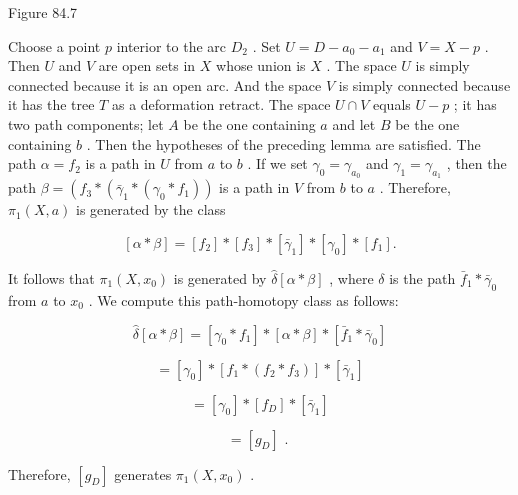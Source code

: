 Figure 84.7

Choose a point \(p\) interior to the arc \({D}_{2}\) . Set \(U = D - {a}_{0} - {a}_{1}\) and \(V = X - p\) . Then \(U\) and \(V\) are open sets in \(X\) whose union is \(X\) . The space \(U\) is simply connected because it is an open arc. And the space \(V\) is simply connected because it has the tree \(T\) as a deformation retract. The space \(U \cap  V\) equals \(U - p\) ; it has two path components; let \(A\) be the one containing \(a\) and let \(B\) be the one containing \(b\) . Then the hypotheses of the preceding lemma are satisfied. The path \(\alpha  = {f}_{2}\) is a path in \(U\) from \(a\) to \(b\) . If we set \({\gamma }_{0} = {\gamma }_{{a}_{0}}\) and \({\gamma }_{1} = {\gamma }_{{a}_{1}}\) , then the path \(\beta  = \left( {{f}_{3} * \left( {{\bar{\gamma }}_{1} * \left( {{\gamma }_{0} * {f}_{1}}\right) }\right) }\right.\) is a path in \(V\) from \(b\) to \(a\) . Therefore, \({\pi }_{1}\left( {X,a}\right)\) is generated by the class

\[
\left\lbrack  {\alpha  * \beta }\right\rbrack   = \left\lbrack  {f}_{2}\right\rbrack   * \left\lbrack  {f}_{3}\right\rbrack   * \left\lbrack  {\bar{\gamma }}_{1}\right\rbrack   * \left\lbrack  {\gamma }_{0}\right\rbrack   * \left\lbrack  {f}_{1}\right\rbrack  .
\]

It follows that \({\pi }_{1}\left( {X,{x}_{0}}\right)\) is generated by \(\widehat{\delta }\left\lbrack  {\alpha  * \beta }\right\rbrack\) , where \(\delta\) is the path \({\bar{f}}_{1} * {\bar{\gamma }}_{0}\) from \(a\) to \({x}_{0}\) . We compute this path-homotopy class as follows:

\[
\widehat{\delta }\left\lbrack  {\alpha  * \beta }\right\rbrack   = \left\lbrack  {{\gamma }_{0} * {f}_{1}}\right\rbrack   * \left\lbrack  {\alpha  * \beta }\right\rbrack   * \left\lbrack  {{\bar{f}}_{1} * {\bar{\gamma }}_{0}}\right\rbrack
\]

\[
= \left\lbrack  {\gamma }_{0}\right\rbrack   * \left\lbrack  {{f}_{1} * \left( {{f}_{2} * {f}_{3}}\right) }\right\rbrack   * \left\lbrack  {\bar{\gamma }}_{1}\right\rbrack
\]

\[
= \left\lbrack  {\gamma }_{0}\right\rbrack   * \left\lbrack  {f}_{D}\right\rbrack   * \left\lbrack  {\bar{\gamma }}_{1}\right\rbrack
\]

\[
= \left\lbrack  {g}_{D}\right\rbrack  \text{ . }
\]

Therefore, \(\left\lbrack  {g}_{D}\right\rbrack\) generates \({\pi }_{1}\left( {X,{x}_{0}}\right)\) .

